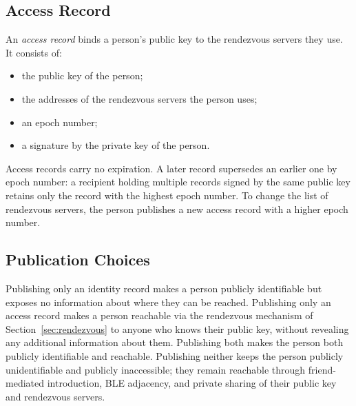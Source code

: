 \subsection{Access Record}
\label{sec:access-record}
An \emph{access record} binds a person's public key to the rendezvous servers they use.  It consists of:
\begin{itemize}
\item the public key of the person;
\item the addresses of the rendezvous servers the person uses;
\item an epoch number;
\item a signature by the private key of the person.
\end{itemize}

Access records carry no expiration.  A later record supersedes an earlier one by epoch number: a recipient holding multiple records signed by the same public key retains only the record with the highest epoch number.  To change the list of rendezvous servers, the person publishes a new access record with a higher epoch number.

\subsection{Publication Choices}
\label{sec:publication-choices}
Publishing only an identity record makes a person publicly identifiable but exposes no information about where they can be reached.  Publishing only an access record makes a person reachable via the rendezvous mechanism of Section~\ref{sec:rendezvous} to anyone who knows their public key, without revealing any additional information about them.  Publishing both makes the person both publicly identifiable and reachable.  Publishing neither keeps the person publicly unidentifiable and publicly inaccessible; they remain reachable through friend-mediated introduction, BLE adjacency, and private sharing of their public key and rendezvous servers.
